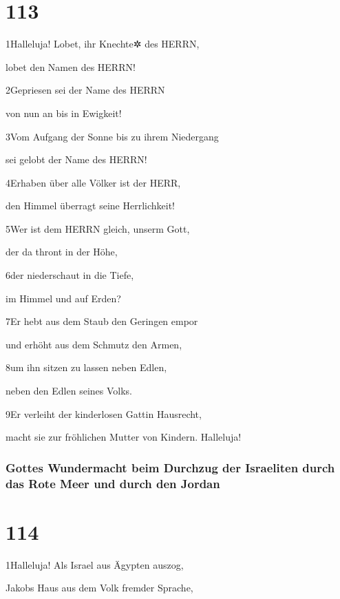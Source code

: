 \hypertarget{section-112}{%
\section{113}\label{section-112}}

1Halleluja! Lobet, ihr Knechte✲ des HERRN,

lobet den Namen des HERRN!

2Gepriesen sei der Name des HERRN

von nun an bis in Ewigkeit!

3Vom Aufgang der Sonne bis zu ihrem Niedergang

sei gelobt der Name des HERRN!

4Erhaben über alle Völker ist der HERR,

den Himmel überragt seine Herrlichkeit!

5Wer ist dem HERRN gleich, unserm Gott,

der da thront in der Höhe,

6der niederschaut in die Tiefe,

im Himmel und auf Erden?

7Er hebt aus dem Staub den Geringen empor

und erhöht aus dem Schmutz den Armen,

8um ihn sitzen zu lassen neben Edlen,

neben den Edlen seines Volks.

9Er verleiht der kinderlosen Gattin Hausrecht,

macht sie zur fröhlichen Mutter von Kindern. Halleluja!

\hypertarget{gottes-wundermacht-beim-durchzug-der-israeliten-durch-das-rote-meer-und-durch-den-jordan}{%
\subsubsection{Gottes Wundermacht beim Durchzug der Israeliten durch das
Rote Meer und durch den
Jordan}\label{gottes-wundermacht-beim-durchzug-der-israeliten-durch-das-rote-meer-und-durch-den-jordan}}

\hypertarget{section-113}{%
\section{114}\label{section-113}}

1Halleluja! Als Israel aus Ägypten auszog,

Jakobs Haus aus dem Volk fremder Sprache,

